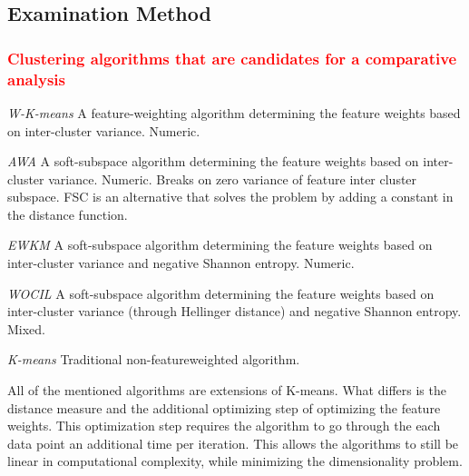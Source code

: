\documentclass[a4paper,11pt]{article}
\begin{document}



\subsection{Examination Method}

\textcolor{red}{\subsubsection{Clustering algorithms that are candidates for a comparative analysis}}
\textit{W-K-means}\cite{huang2005automated} A feature-weighting algorithm determining the feature weights based on inter-cluster variance. Numeric.

\textit{AWA}\cite{Chan2004} A soft-subspace algorithm determining the feature weights based on inter-cluster variance. Numeric. Breaks on zero variance of feature inter cluster subspace. FSC is an alternative that solves the problem by adding a constant in the distance function.

\textit{EWKM}\cite{Jing2007} A soft-subspace algorithm determining the feature weights based on inter-cluster variance and negative Shannon entropy. Numeric.

\textit{WOCIL}\cite{Jia2018} A soft-subspace algorithm determining the feature weights based on inter-cluster variance (through Hellinger distance) and negative Shannon entropy. Mixed.

\textit{K-means} Traditional non-featureweighted algorithm.

All of the mentioned algorithms are extensions of K-means. What differs is the distance measure and the additional optimizing step of optimizing the feature weights. This optimization step requires the algorithm to go through the each data point an additional time per iteration. This allows the algorithms to still be linear in computational complexity, while minimizing the dimensionality problem.
\end{document}

